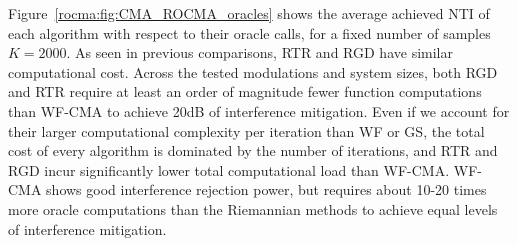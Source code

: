 Figure~\ref{rocma:fig:CMA_ROCMA_oracles} shows the average achieved NTI of each algorithm with respect to their oracle calls, for a fixed number of samples $K=2000$. 
As seen in previous comparisons, RTR and RGD have similar computational cost. 
Across the tested modulations and system sizes, both RGD and RTR require at least an order of magnitude fewer function computations than WF-CMA to achieve 20dB of interference mitigation. 
Even if we account for their larger computational complexity per iteration than WF or GS, the total cost of every algorithm is dominated by the number of iterations, and RTR and RGD incur significantly lower total computational load than WF-CMA. 
WF-CMA shows good interference rejection power, but requires about 10-20 times more oracle computations than the Riemannian methods to achieve equal levels of interference mitigation.

